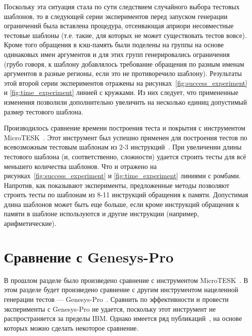 \documentclass[14pt]{extreport}
\begin{document}
Поскольку эта ситуация стала по сути следствием случайного выбора тестовых шаблонов, то в следующей серии экспериментов перед запуском генерации ограничений была вставлена процедура, отсеивающая априори несовместные тестовые шаблоны (т.е. такие, для которых не может существовать тестов вовсе). Кроме того обращения в кэш-память были поделены на группы на основе одинаковых имен аргументов и для этих групп генерировались ограничения (грубо говоря, к шаблону добавлялось требование обращения по разным именам аргументов в разные регионы, если это не противоречило шаблону). Результаты этой второй серии экспериментов отражены на рисунках~\ref{fig:success_experiment} и \ref{fig:time_experiment} линией с кружками. Из них следует, что примененные изменения позволили дополнительно увеличить на несколько единиц допустимый размер тестового шаблона.

Производилось сравнение времени построения теста и покрытия с инструментом MicroTESK~\cite{MicroTESK}. Этот инструмент был успешно применен для построения тестов по всевозможным тестовым шаблонам из 2-3 инструкций~\cite{vorobyev}. При увеличении длины тестового шаблона (и, соответственно, сложности) удается строить тесты для всё меньшего количества шаблонов. Что и отражено на рисунках~\ref{fig:success_experiment} и \ref{fig:time_experiment} линиями с ромбами. Напротив, как показывают эксперименты, предложенные методы позволяют строить тесты по шаблонам из 8-11 инструкций обращения к памяти. Допустимая длина шаблонов может быть еще больше, если кроме инструкций обращения к памяти в шаблоне используются и другие инструкции (например, арифметические).

\section{Сравнение с Genesys-Pro}

В прошлом разделе было произведено сравнение с инструментом MicroTESK~\cite{???????}. В этом разделе будет произведено сравнение с другим инструментом нацеленной генерации тестов --- Genesys-Pro~\cite{?????}. Сравнить по эффективности и провести эксперименты с Genesys-Pro не удается, поскольку этот инструмент не распространяется за пределы IBM. Однако имеется ряд публикаций~\cite{??????}, на основе которых можно сделать некоторое сравнение.
\end{document}
